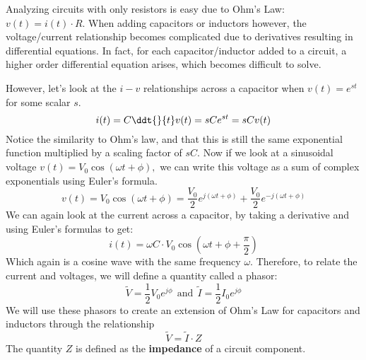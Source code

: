 

Analyzing circuits with only resistors is easy due to Ohm's Law: $v(t)=i(t) \cdot R$.
When adding capacitors or inductors however, the voltage/current relationship becomes complicated due to derivatives resulting in differential equations.
In fact, for each capacitor/inductor added to a circuit, a higher order differential equation arises, which becomes difficult to solve.

However, let's look at the $i-v$ relationships across a capacitor when $v(t) = e^{st}$ for some scalar $s.$
\begin{equation}
i(t) = C\ddt{}{t} v(t) = sC e^{st} = sC v(t)
\end{equation}
Notice the similarity to Ohm's law, and that this is still the same exponential function multiplied by a scaling factor of $sC.$ Now if we look at a sinusoidal voltage $v(t) = V_{0} \cos(\omega{} t+\phi{}),$ we can write this voltage as a sum of complex exponentials using Euler's formula.
\begin{equation}
v(t) = V_{0} \cos(\omega{} t+\phi{}) = \frac{V_{0}}{2} e^{j(\omega{} t + \phi{})} + \frac{V_{0}}{2} e^{-j(\omega{} t + \phi{})}
\end{equation}
We can again look at the current across a capacitor, by taking a derivative and using Euler's formulas to get:
\begin{equation} 
i(t) = \omega C \cdot V_{0} \cos(\omega{} t + \phi{} + \frac{\pi}{2})
\end{equation}
Which again is a cosine wave with the same frequency $\omega.$ \vskip 0pt
Therefore, to relate the current and voltages, we will define a quantity called a phasor:
\begin{equation}
\widetilde{V} = \frac{1}{2} V_{0} e^{j \phi{}} \ \  \text{and} \ \ \widetilde{I} = \frac{1}{2} I_{0} e^{j \phi{}}
\end{equation}
We will use these phasors to create an extension of Ohm's Law for capacitors and inductors through the relationship
\begin{equation}
\widetilde{V} = \widetilde{I} \cdot Z
\end{equation}
The quantity $Z$ is defined as the \textbf{impedance} of a circuit component.



